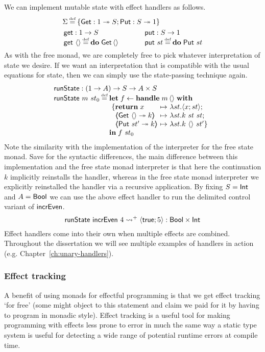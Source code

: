 \documentclass[12pt,phd,lfcs,twoside,openright,logo,leftchapter,normalheadings]{infthesis}
\theoremstyle{plain}
\theoremstyle{definition}
\begin{document}
We can implement mutable state with effect handlers as follows.
%
\[
  \ba{@{~}l@{\qquad\quad}@{~}r}
    \multicolumn{2}{l}{\Sigma \defas \{\Get : \UnitType \opto S;\Put : S \opto \UnitType\}} \smallskip\\
    \multirow{2}{*}{
      \bl
        \getF : \UnitType \to S\\
        \getF~\Unit \defas \Do\;\Get\,\Unit
      \el} &
    \multirow{2}{*}{
      \bl
        \putF : S \to \UnitType\\
        \putF~st \defas \Do\;\Put~st
      \el} \\ & %
  \ea
\]
%
As with the free monad, we are completely free to pick whatever
interpretation of state we desire. If we want an interpretation that
is compatible with the usual equations for state, then we can simply
use the state-passing technique again.
%
\[
  \bl
    \runState : (\UnitType \to A) \to S \to A \times S\\
    \runState~m~st_0 \defas
      \bl
        \Let\;f \revto \Handle\;m\,\Unit\;\With\\~\{
          \ba[t]{@{}l@{~}c@{~}l}
            \Return\;x &\mapsto& \lambda st.\Record{x;st};\\
            \OpCase{\Get}{\Unit}{k} &\mapsto& \lambda st.k~st~st;\\
            \OpCase{\Put}{st'}{k}   &\mapsto& \lambda st.k~\Unit~st'\}
          \ea\\
        \In\;f~st_0
     \el
  \el
\]
%
Note the similarity with the implementation of the interpreter for the
free state monad. Save for the syntactic differences, the main
difference between this implementation and the free state monad
interpreter is that here the continuation $k$ implicitly reinstalls
the handler, whereas in the free state monad interpreter we explicitly
reinstalled the handler via a recursive application.
%
By fixing $S = \mathsf{Int}$ and $A = \mathsf{Bool}$ we can use the above effect
handler to run the delimited control variant of $\mathsf{incrEven}$.
%
\[
  \mathsf{runState}~\mathsf{incrEven}~4 \leadsto^+ \langle \mathsf{true};5 \rangle : \mathsf{Bool} \times \mathsf{Int}
\]
%
Effect handlers come into their own when multiple effects are
combined. Throughout the dissertation we will see multiple examples of
handlers in action (e.g. Chapter~\ref{ch:unary-handlers}).

\subsubsection{Effect tracking}
A benefit of using monads for effectful programming is that we get
effect tracking `for free' (some might object to this statement and
claim we paid for it by having to program in monadic style). Effect
tracking is a useful tool for making programming with effects less
prone to error in much the same way a static type system is useful for
detecting a wide range of potential runtime errors at compile time.
\end{document}
